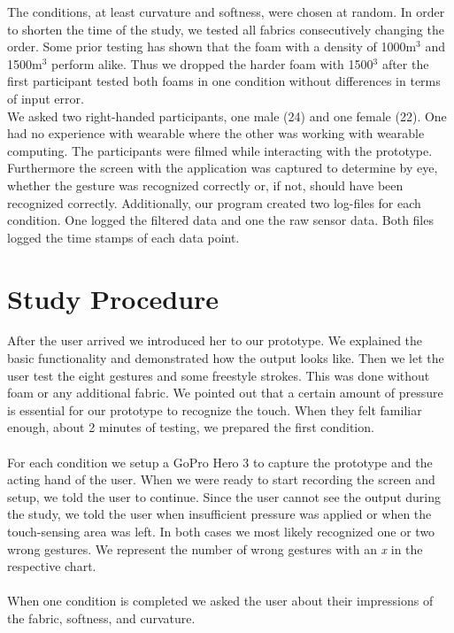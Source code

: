 The conditions, at least curvature and softness, were chosen at random. In order to shorten the time of the study, we tested all fabrics consecutively changing the order. Some prior testing has shown that the foam with a density of 1000m$^3$ and 1500m$^3$ perform alike. Thus we dropped the harder foam with 1500$^3$ after the first participant tested both foams in one condition without differences in terms of input error. \\
We asked two right-handed participants, one male (24) and one female (22). One had no experience with wearable where the other was working with wearable computing. The participants were filmed while interacting with the prototype. Furthermore the screen with the application was captured to determine by eye, whether the gesture was recognized correctly or, if not, should have been recognized correctly. Additionally, our program created two log-files for each condition. One logged the filtered data and one the raw sensor data. Both files logged the time stamps of each data point.

\section{Study Procedure}
After the user arrived we introduced her to our prototype. We explained the basic functionality and demonstrated how the output looks like. Then we let the user test the eight gestures and some freestyle strokes. This was done without foam or any additional fabric. We pointed out that a certain amount of pressure is essential for our prototype to recognize the touch. When they felt familiar enough, about 2 minutes of testing, we prepared the first condition. 
\\ \\
For each condition we setup a GoPro Hero 3 to capture the prototype and the acting hand of the user. When we were ready to start recording the screen and setup, we told the user to continue. Since the user cannot see the output during the study, we told the user when insufficient  pressure was applied or when the touch-sensing area was left. In both cases we most likely recognized one or two wrong gestures. We represent the number of wrong gestures with an \emph{x} in the respective chart. 
\\ \\
When one condition is completed we asked the user about their impressions of the fabric, softness, and curvature. 

